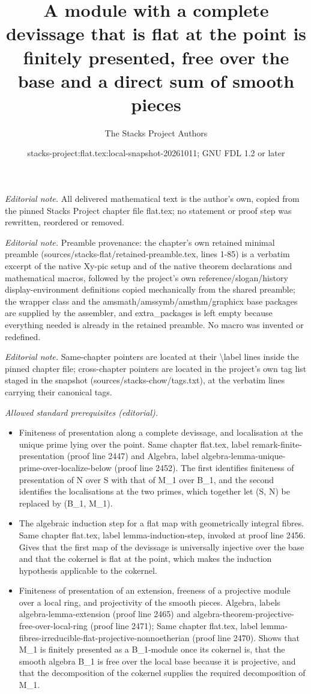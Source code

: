 \documentclass[10pt,a4paper]{amsart}
\title{A module with a complete devissage that is flat at the point is finitely presented, free over the base and a direct sum of smooth pieces}
\author{The Stacks Project Authors}
\date{stacks-project:flat.tex:local-snapshot-20261011; GNU FDL 1.2 or later}
\theoremstyle{plain}
\theoremstyle{definition}
\theoremstyle{remark}
\numberwithin{equation}{subsection}
\begin{document}
\maketitle
\noindent\textit{Editorial note.} All delivered mathematical text is the author's own, copied from the pinned Stacks Project chapter file flat.tex; no statement or proof step was rewritten, reordered or removed.\par\medskip
\noindent\textit{Editorial note.} Preamble provenance: the chapter's own retained minimal preamble (sources/stacks-flat/retained-preamble.tex, lines 1-85) is a verbatim excerpt of the native Xy-pic setup and of the native theorem declarations and mathematical macros, followed by the project's own reference/slogan/history display-environment definitions copied mechanically from the shared preamble; the wrapper class and the amsmath/amssymb/amsthm/graphicx base packages are supplied by the assembler, and extra\_packages is left empty because everything needed is already in the retained preamble. No macro was invented or redefined.\par\medskip
\noindent\textit{Editorial note.} Same-chapter pointers are located at their \textbackslash{}label lines inside the pinned chapter file; cross-chapter pointers are located in the project's own tag list staged in the snapshot (sources/stacks-chow/tags.txt), at the verbatim lines carrying their canonical tags.\par\medskip
\noindent\textit{Allowed standard prerequisites (editorial).}\begin{itemize}
\item Finiteness of presentation along a complete devissage, and localisation at the unique prime lying over the point. Same chapter flat.tex, label remark-finite-presentation (proof line 2447) and Algebra, label algebra-lemma-unique-prime-over-localize-below (proof line 2452). The first identifies finiteness of presentation of N over S with that of M\_1 over B\_1, and the second identifies the localisations at the two primes, which together let (S, N) be replaced by (B\_1, M\_1).
\item The algebraic induction step for a flat map with geometrically integral fibres. Same chapter flat.tex, label lemma-induction-step, invoked at proof line 2456. Gives that the first map of the devissage is universally injective over the base and that the cokernel is flat at the point, which makes the induction hypothesis applicable to the cokernel.
\item Finiteness of presentation of an extension, freeness of a projective module over a local ring, and projectivity of the smooth pieces. Algebra, labels algebra-lemma-extension (proof line 2465) and algebra-theorem-projective-free-over-local-ring (proof line 2471); Same chapter flat.tex, label lemma-fibres-irreducible-flat-projective-nonnoetherian (proof line 2470). Shows that M\_1 is finitely presented as a B\_1-module once its cokernel is, that the smooth algebra B\_1 is free over the local base because it is projective, and that the decomposition of the cokernel supplies the required decomposition of M\_1.
\end{itemize}\medskip
\end{document}
